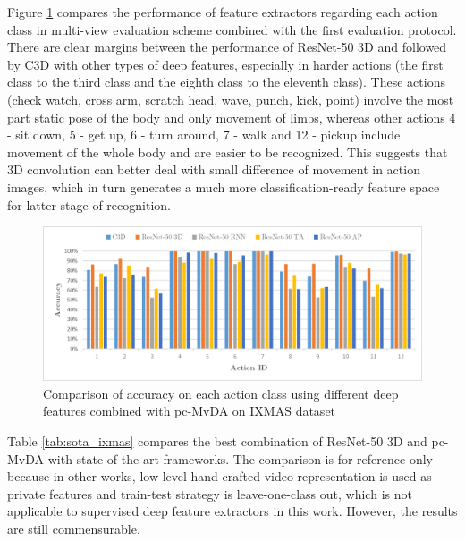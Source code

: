     Figure \ref{fig:pc-MvDA_confusion_ixmas} compares the performance of feature extractors regarding each action class in multi-view evaluation scheme combined with the first evaluation protocol. There are clear margins between the performance of ResNet-50 3D and followed by C3D with other types of deep features, especially in harder actions (the first class to the third class and the eighth class to the eleventh class). These actions (check watch, cross arm, scratch head, wave, punch, kick, point) involve the most part static pose of the body and only movement of limbs, whereas other actions 4 - sit down, 5 - get up, 6 - turn around, 7 - walk and 12 - pickup include movement of the whole body and are easier to be recognized. This suggests that 3D convolution can better deal with small difference of movement in action images, which in turn generates a much more classification-ready feature space for latter stage of recognition.

    \begin{figure}[htbp]
        \centering
        \includegraphics[width=0.8\linewidth]{figs/pc-MvDA_confusion_ixmas.png}
        \caption{Comparison of accuracy on each action class using different deep features combined with pc-MvDA on IXMAS dataset}
        \label{fig:pc-MvDA_confusion_ixmas}
    \end{figure}

    Table \ref{tab:sota_ixmas} compares the best combination of ResNet-50 3D and pc-MvDA with state-of-the-art frameworks. The comparison is for reference only because in other works, low-level hand-crafted video representation is used as private features and train-test strategy is leave-one-class out, which is not applicable to supervised deep feature extractors in this work. However, the results are still commensurable. %


